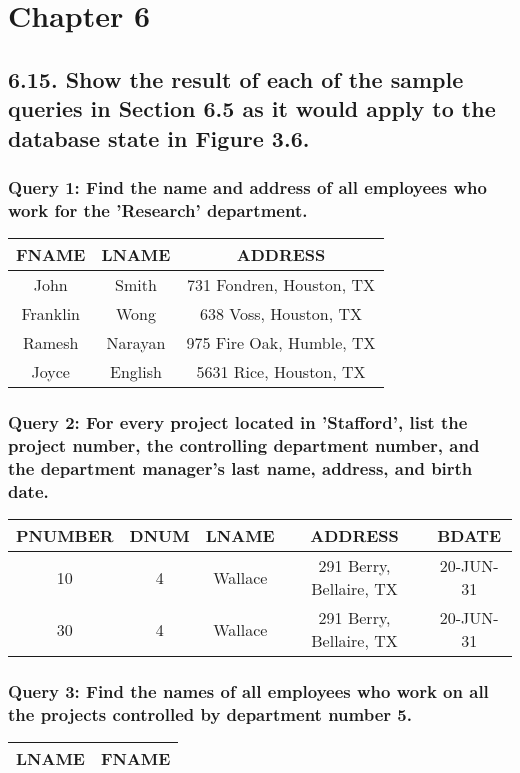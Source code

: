 \section*{Chapter 6}

\subsection*{6.15. Show the result of each of the sample queries in Section 6.5 as it would apply to the database state in Figure 3.6.} 

\subsubsection*{Query 1: Find the name and address of all employees who work for the 'Research' department.}
\begin{center}
\begin{tabular}{ c | c | c }
  FNAME & LNAME & ADDRESS \\ \hline
  John & Smith & 731 Fondren, Houston, TX \\
  Franklin & Wong & 638 Voss, Houston, TX \\
  Ramesh &  Narayan & 975 Fire Oak, Humble, TX \\
  Joyce & English & 5631 Rice, Houston, TX \\
\end{tabular}
\end{center}

\subsubsection*{Query 2: For every project located in 'Stafford', list the project number, the controlling department number, and the department manager's last name, address, and birth date.}
\begin{center} 
\begin{tabular}{ c | c | c | c | c}
  PNUMBER & DNUM & LNAME & ADDRESS & BDATE \\ \hline
  10 & 4 & Wallace & 291 Berry, Bellaire, TX &20-JUN-31 \\
  30 & 4 & Wallace & 291 Berry, Bellaire, TX & 20-JUN-31 \\ 
\end{tabular}
\end{center}

\subsubsection*{Query 3: Find the names of all employees who work on all the projects controlled by department number 5.}
\begin{center}
\begin{tabular}{ c | c }
  LNAME & FNAME \\ \hline
\end{tabular}
\end{center}

